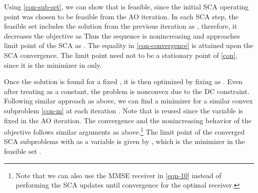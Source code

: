 Using \eqref{con-sub-set}, we can show that  is feasible, since the initial \ac{SCA} operating point  was chosen to be feasible from the  \ac{AO} iteration. In each \ac{SCA} step, the feasible set includes the solution from the previous iteration as , therefore, it decreases the objective as \cite{lanckriet2009convergence,scutari_1,amir}
\iftoggle{single_column}{
\begin{equation} \label{con-convergence}
f(\iter{\mx}{0}{i},\iter{\my}{\ast}{i-1},\iter{\mz}{0}{i}) \geq f(\iter{\mx}{k}{i},\iter{\my}{\ast}{i-1},\iter{\mz}{k}{i}) \geq f(\iter{\mx}{k+1}{i},\iter{\my}{\ast}{i-1},\iter{\mz}{k+1}{i}) \geq f(\iter{\mx}{\ast}{i},\iter{\my}{\ast}{i-1},\iter{\mz}{\ast|\my}{i}). 
\end{equation}}{
\begin{multline} \label{con-convergence} \allowdisplaybreaks
f(\iter{\mx}{0}{i},\iter{\my}{\ast}{i-1},\iter{\mz}{0}{i}) \geq f(\iter{\mx}{k}{i},\iter{\my}{\ast}{i-1},\iter{\mz}{k}{i}) \\ \geq f(\iter{\mx}{k+1}{i},\iter{\my}{\ast}{i-1},\iter{\mz}{k+1}{i}) \geq f(\iter{\mx}{\ast}{i},\iter{\my}{\ast}{i-1},\iter{\mz}{\ast|\my}{i}). 
\end{multline}}
Thus the sequence  is nonincreasing and approaches limit point of the \ac{SCA} as . The equality in \eqref{con-convergence} is attained upon the \ac{SCA} convergence. The limit point  need not to be a stationary point of \eqref{con}, since it is the minimizer in  only. 

Once the solution is found for a fixed \me{\my}, it is then optimized by fixing \me{\mx} as . Even after treating \me{\mx} as a constant, the problem is nonconvex due to the \ac{DC} constraint. Following similar approach as above, we can find a minimizer  for a similar convex subproblem \eqref{con-m} at each iteration . Note that  is reused since the variable \me{\mx} is fixed in the  \ac{AO} iteration. The convergence and the nonincreasing behavior of the objective follows similar arguments as above.\footnote{Note that we can also use the \ac{MMSE} receiver in \eqref{eqn-10} instead of performing the \ac{SCA} updates until convergence for the optimal receiver.} The limit point of the converged \ac{SCA} subproblems with \me{\my} as a variable is given by , which is the minimizer in the feasible set .

